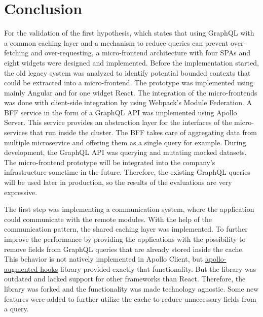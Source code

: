 \chapter{Conclusion}\label{chapter:conclusion}

\noindent For the validation of the first hypothesis, which states that using GraphQL with a common caching layer and a mechanism to reduce queries can prevent over-fetching and over-requesting, a micro-frontend architecture with four \acp{SPA} and eight widgets were designed and implemented. Before the implementation started, the old legacy system was analyzed to identify potential bounded contexts that could be extracted into a micro-frontend. The prototype was implemented using mainly Angular and for one widget React. The integration of the micro-frontends was done with client-side integration by using Webpack's Module Federation. A \ac{BFF} service in the form of a GraphQL \ac{API} was implemented using Apollo Server. This service provides an abstraction layer for the interfaces of the micro-services that run inside the cluster. The \ac{BFF} takes care of aggregating data from multiple microservice and offering them as a single query for example. During development, the GraphQL \ac{API} was querying and mutating mocked datasets. The micro-frontend prototype will be integrated into the company's infrastructure sometime in the future. Therefore, the existing GraphQL queries will be used later in production, so the results of the evaluations are very expressive.

\bigskip

\noindent The first step was implementing a communication system, where the application could communicate with the remote modules. With the help of the communication pattern, the shared caching layer was implemented. To further improve the performance by providing the applications with the possibility to remove fields from GraphQL queries that are already stored inside the cache. This behavior is not natively implemented in Apollo Client, but \href{https://github.com/appmotion/apollo-augmented-hooks}{apollo-augmented-hooks} library provided exactly that functionality. But the library was outdated and lacked support for other frameworks than React. Therefore, the library was forked and the functionality was made technology agnostic. Some new features were added to further utilize the cache to reduce unnecessary fields from a query.

\bigskip

